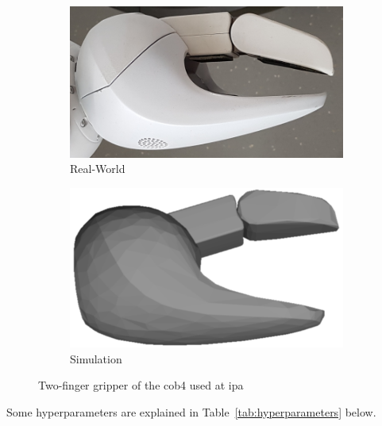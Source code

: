 \begin{figure}[htbp]
	\centering
	\begin{subfigure}{0.49\textwidth}
		\includegraphics[height=0.15\textheight, center]{resources/figures/introduction/cob4_gripper}
		\caption{Real-World}
	\end{subfigure}
	\begin{subfigure}{0.49\textwidth}
		\includegraphics[height=0.15\textheight, center]{resources/figures/introduction/cob4_gripper_sim}
		\caption{Simulation}
	\end{subfigure}
	\caption[Two-finger gripper of the \acs{cob4}]{Two-finger gripper of the \acs{cob4} used at \acs{ipa}}  %
	\label{fig:Grippers}
\end{figure}

\noindent Some hyperparameters are explained in Table~\ref{tab:hyperparameters} below.  %

